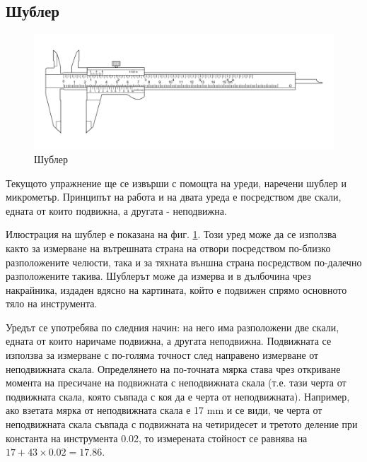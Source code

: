 \documentclass[12pt]{article}
\begin{document}
\subsection{Шублер}
\begin{figure}
    \centering
    \includegraphics[width=\textwidth]{images/Vernier_Caliper_150mm_lines.svg.png}
    \caption{Шублер}
    \label{fig:caliper}
\end{figure}

Текущото упражнение ще се извърши с помощта на уреди, наречени шублер и микрометър. Принципът на работа и на двата уреда е посредством две скали, едната от които подвижна, а другата - неподвижна.

Илюстрация на шублер е показана на фиг. \ref{fig:caliper}. Този уред може да се използва както за измерване на вътрешната страна на отвори посредством по-близко разположените челюсти, така и за тяхната външна страна посредством по-далечно разположените такива. Шублерът може да измерва и в дълбочина чрез накрайника, издаден вдясно на картината, който е подвижен спрямо основното тяло на инструмента. 

Уредът се употребява по следния начин: на него има разположени две скали, едната от които наричаме подвижна, а другата неподвижна. Подвижната се използва за измерване с по-голяма точност след направено измерване от неподвижната скала. Определянето на по-точната мярка става чрез откриване момента на пресичане на подвижната с неподвижната скала (т.е. тази черта от подвижната скала, която съвпада с коя да е черта от неподвижната). Например, ако взетата мярка от неподвижната скала е 17 mm и се види, че черта от неподвижната скала съвпада с подвижната на четиридесет и третото деление при константа на инструмента 0.02, то измерената стойност се равнява на \begin{math} 17 + 43 \times 0.02 = 17.86 \end{math}. 
\end{document}

